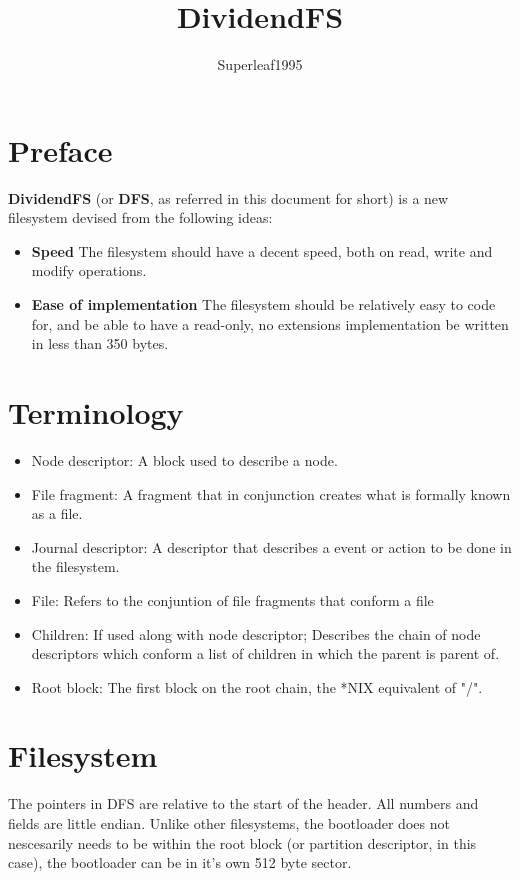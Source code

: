 \documentclass[12pt]{article}
\title{DividendFS}
\author{Superleaf1995}
\begin{document}
\maketitle

\newpage

\section{Preface}
\textbf{DividendFS} (or \textbf{DFS}, as referred in this document for short) is a new filesystem devised from the following ideas:

\begin{itemize}
	\item \textbf{Speed} The filesystem should have a decent speed, both on read, write and modify operations.
	\item \textbf{Ease of implementation} The filesystem should be relatively easy to code for, and be able to have a read-only, no extensions implementation be written in less than 350 bytes.
\end{itemize}

\newpage

\section{Terminology}
\begin{itemize}
	\item Node descriptor: A block used to describe a node.
	\item File fragment: A fragment that in conjunction creates what is formally known as a file.
	\item Journal descriptor: A descriptor that describes a event or action to be done in the filesystem.
	\item File: Refers to the conjuntion of file fragments that conform a file
	\item Children: If used along with node descriptor; Describes the chain of node descriptors which conform a list of children in which the parent is parent of.
	\item Root block: The first block on the root chain, the *NIX equivalent of "/".
\end{itemize}

\newpage

\section{Filesystem}
The pointers in DFS are relative to the start of the header. All numbers and fields are little endian.
Unlike other filesystems, the bootloader does not nescesarily needs to be within the root block (or partition descriptor, in this case), the bootloader can be in it's own 512 byte sector.
\end{document}
